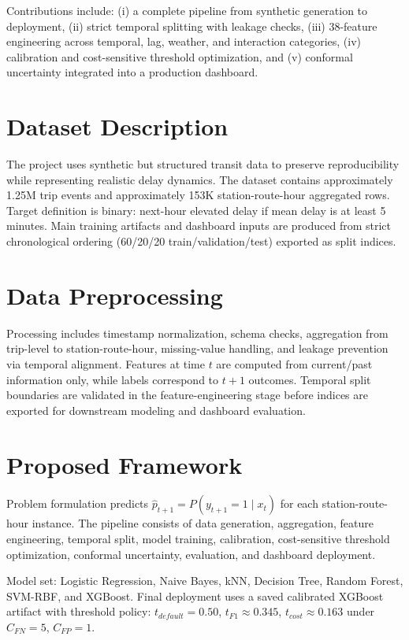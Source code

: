 \documentclass[conference]{IEEEtran}
\begin{document}
Contributions include: (i) a complete pipeline from synthetic generation to deployment, (ii) strict temporal splitting with leakage checks, (iii) 38-feature engineering across temporal, lag, weather, and interaction categories, (iv) calibration and cost-sensitive threshold optimization, and (v) conformal uncertainty integrated into a production dashboard.

\section{Dataset Description}
The project uses synthetic but structured transit data to preserve reproducibility while representing realistic delay dynamics. The dataset contains approximately 1.25M trip events and approximately 153K station-route-hour aggregated rows. Target definition is binary: next-hour elevated delay if mean delay is at least 5 minutes. Main training artifacts and dashboard inputs are produced from strict chronological ordering (60/20/20 train/validation/test) exported as split indices.

\section{Data Preprocessing}
Processing includes timestamp normalization, schema checks, aggregation from trip-level to station-route-hour, missing-value handling, and leakage prevention via temporal alignment. Features at time $t$ are computed from current/past information only, while labels correspond to $t+1$ outcomes. Temporal split boundaries are validated in the feature-engineering stage before indices are exported for downstream modeling and dashboard evaluation.

\section{Proposed Framework}
Problem formulation predicts $\hat{p}_{t+1}=P(y_{t+1}=1\mid x_t)$ for each station-route-hour instance. The pipeline consists of data generation, aggregation, feature engineering, temporal split, model training, calibration, cost-sensitive threshold optimization, conformal uncertainty, evaluation, and dashboard deployment.

Model set: Logistic Regression, Naive Bayes, kNN, Decision Tree, Random Forest, SVM-RBF, and XGBoost. Final deployment uses a saved calibrated XGBoost artifact with threshold policy: $t_{default}=0.50$, $t_{F1}\approx0.345$, $t_{cost}\approx0.163$ under $C_{FN}=5$, $C_{FP}=1$.
\end{document}
